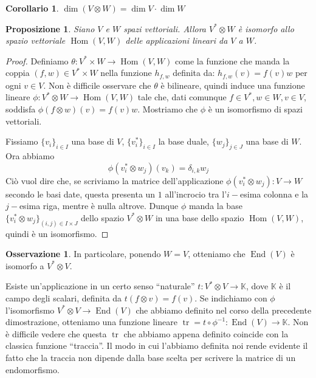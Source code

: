 \documentclass[11pt]{article}
\theoremstyle{plain}
\newtheorem{prop}[thm]{Proposizione}
\newtheorem*{cor}{Corollario}
\theoremstyle{definition}
\newtheorem*{rem}{Osservazione}
\theoremstyle{remark}
\newcommand{\K}{\mathbb{K}}
\DeclareMathOperator{\tr}{tr}
\DeclareMathOperator{\Hom}{Hom}
\DeclareMathOperator{\End}{End}
\begin{document}
\begin{cor}
$\dim(V \otimes W) = \dim V \cdot \dim W$
\end{cor}


\begin{prop}
Siano $V$ e $W$ spazi vettoriali. Allora $V^*\otimes W$ è isomorfo allo spazio vettoriale $\Hom(V,W)$ delle applicazioni lineari da $V$ a $W$.
\end{prop}
\begin{proof}
Definiamo $\theta: V^*\times W \to \Hom(V,W)$ come la funzione che manda la coppia $(f, w)\in V^*\times W$ nella funzione  $h_{f,w}$ definita da:
$h_{f,w}(v) = f(v)w$ per ogni $v\in V$. Non è difficile osservare che $\theta$ è bilineare, quindi induce una funzione lineare
$\phi : V^*\otimes W \to \Hom(V,W)$ tale che, dati comunque $f\in V^*, w\in W, v\in V$, soddisfa $\phi(f\otimes w)(v) = f(v)w$.
Mostriamo che $\phi$ è un isomorfismo di spazi vettoriali.

Fissiamo $\{v_i\}_{i\in I}$ una base di $V$, $\{v_i^*\}_{i\in I}$ la base duale, $\{w_j\}_{j\in J}$ una base di $W$.
Ora abbiamo 
\[\phi(v_i^*\otimes w_j)(v_k) = \delta_{i,k} w_j\]
Ciò vuol dire che, se scriviamo la matrice dell'applicazione $\phi(v_i^*\otimes w_j):V\to W$ secondo le basi date, questa presenta un $1$ all'incrocio
tra l'$i-$esima colonna e la $j-$esima riga, mentre è nulla altrove.
Dunque $\phi$ manda la base $\{v_i^*\otimes w_j\}_{(i,j)\in I\times J}$ dello spazio $V^*\otimes W$ in una base dello spazio $\Hom(V,W)$,
quindi è un isomorfismo.
\end{proof}

\begin{rem}
In particolare, ponendo $W=V$, otteniamo che $\End(V)$ è isomorfo a $V^*\otimes V$.

Esiste un'applicazione in un certo senso ``naturale'' $t:V^*\otimes V \to \K$, dove $\K$ è il campo degli scalari, definita da
$t(f\otimes v) = f(v)$.
Se indichiamo con $\phi$ l'isomorfismo $V^*\otimes V\to \End(V)$ che abbiamo definito nel corso della precedente dimostrazione,
otteniamo una funzione lineare $\tr = t\circ \phi^{-1}: \End(V)\to \K$. Non è difficile vedere che questa $\tr$ che abbiamo appena definito 
coincide con la classica funzione ``traccia''. Il modo in cui l'abbiamo definita noi rende evidente il fatto che la traccia non dipende
dalla base scelta per scrivere la matrice di un endomorfismo.
\end{rem}
\end{document}
